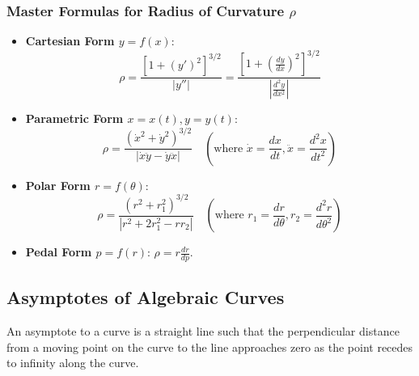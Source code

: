 \subsubsection{Master Formulas for Radius of Curvature $\rho$}
\begin{itemize}[leftmargin=1.5em]
    \item \textbf{Cartesian Form $y = f(x)$}:
    \begin{equation}
        \rho = \frac{\left[1 + (y')^2\right]^{3/2}}{|y''|} = \frac{\left[1 + \left(\frac{dy}{dx}\right)^2\right]^{3/2}}{\left|\frac{d^2y}{dx^2}\right|}
    \end{equation}
    \item \textbf{Parametric Form $x = x(t), y = y(t)$}:
    \begin{equation}
        \rho = \frac{(\dot{x}^2 + \dot{y}^2)^{3/2}}{|\dot{x}\ddot{y} - \dot{y}\ddot{x}|} \quad \left(\text{where } \dot{x} = \frac{dx}{dt}, \ddot{x} = \frac{d^2x}{dt^2}\right)
    \end{equation}
    \item \textbf{Polar Form $r = f(\theta)$}:
    \begin{equation}
        \rho = \frac{(r^2 + r_1^2)^{3/2}}{|r^2 + 2r_1^2 - r r_2|} \quad \left(\text{where } r_1 = \frac{dr}{d\theta}, r_2 = \frac{d^2r}{d\theta^2}\right)
    \end{equation}
    \item \textbf{Pedal Form $p = f(r)$}: $\rho = r \frac{dr}{dp}$.
\end{itemize}

\subsection{Asymptotes of Algebraic Curves}

\begin{definition}[Asymptote]
An asymptote to a curve is a straight line such that the perpendicular distance from a moving point on the curve to the line approaches zero as the point recedes to infinity along the curve.
\end{definition}

